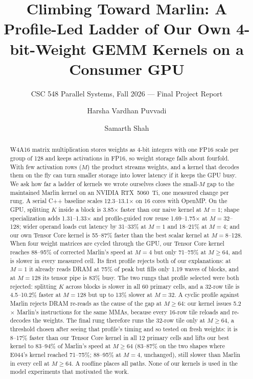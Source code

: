 \documentclass[sigconf,nonacm]{acmart}
\begin{document}
\title{Climbing Toward Marlin: A Profile-Led Ladder of Our Own 4-bit-Weight GEMM Kernels on a Consumer GPU}
\subtitle{CSC 548 Parallel Systems, Fall 2026 --- Final Project Report}

\author{Harsha Vardhan Puvvadi}
\author{Samarth Shah}

\begin{abstract}
W4A16 matrix multiplication stores weights as 4-bit integers with one FP16 scale per group of 128 and keeps activations in FP16, so weight storage falls about fourfold. With few activation rows ($M$) the product streams weights, and a kernel that decodes them on the fly can turn smaller storage into lower latency if it keeps the GPU busy. We ask how far a ladder of kernels we wrote ourselves closes the small-$M$ gap to the maintained Marlin kernel on an NVIDIA RTX~5060~Ti, one measured change per rung. A serial C++ baseline scales 12.3--13.1$\times$ on 16 cores with OpenMP. On the GPU, splitting $K$ inside a block is 3.85$\times$ faster than our naive kernel at $M=1$; shape specialization adds 1.31--1.33$\times$ and profile-guided row reuse 1.69--1.75$\times$ at $M=32$--128; wider operand loads cut latency by 31--33\% at $M=1$ and 18--21\% at $M=4$; and our own Tensor Core kernel is 55--87\% faster than the best scalar kernel at $M=8$--128. When four weight matrices are cycled through the GPU, our Tensor Core kernel reaches 88--95\% of corrected Marlin's speed at $M=4$ but only 71--75\% at $M \ge 64$, and is slower in every measured cell. Its first profile rejects both of our explanations: at $M=1$ it already reads DRAM at 75\% of peak but fills only 1.19 waves of blocks, and at $M=128$ its tensor pipe is 83\% busy. The two rungs that profile selected were both rejected: splitting $K$ across blocks is slower in all 60 primary cells, and a 32-row tile is 4.5--10.2\% faster at $M=128$ but up to 13\% slower at $M=32$. A cyclic profile against Marlin rejects DRAM re-reads as the cause of the gap at $M \ge 64$: our kernel issues 5.2$\times$ Marlin's instructions for the same MMAs, because every 16-row tile reloads and re-decodes the weights. The final rung therefore runs the 32-row tile only at $M \ge 64$, a threshold chosen after seeing that profile's timing and so tested on fresh weights: it is 8--17\% faster than our Tensor Core kernel in all 12 primary cells and lifts our best kernel to 83--94\% of Marlin's speed at $M \ge 64$ (83--87\% on the two shapes where E044's kernel reached 71--75\%; 88--95\% at $M=4$, unchanged), still slower than Marlin in every cell at $M \ge 64$. A roofline places all paths. None of our kernels is used in the model experiments that motivated the work.
\end{abstract}
\end{document}
